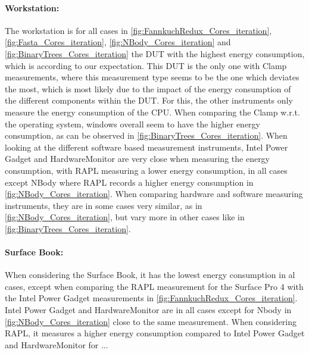 \paragraph{Workstation:} The workstation is for all cases in \cref*{fig:FannkuchRedux_Cores_iteration}, \cref*{fig:Fasta_Cores_iteration}, \cref*{fig:NBody_Cores_iteration} and \cref*{fig:BinaryTrees_Cores_iteration} the DUT with the highest energy consumption, which is according to our expectation. This DUT is the only one with Clamp measurements, where this measurement type seems to be the one which deviates the most, which is most likely due to the impact of the energy consumption of the different components within the DUT. For this, the other instruments only measure the energy consumption of the CPU. When comparing the Clamp w.r.t. the operating system, windows overall seem to have the higher energy consumption, as can be observed in \cref*{fig:BinaryTrees_Cores_iteration}. When looking at the different software based measurement instruments, Intel Power Gadget and HardwareMonitor are very close when measuring the energy consumption, with RAPL measuring a lower energy consumption, in all cases except NBody where RAPL records a higher energy consumption in \cref*{fig:NBody_Cores_iteration}. When comparing hardware and software measuring instruments, they are in some cases very similar, as in \cref*{fig:NBody_Cores_iteration}, but vary more in other cases like in \cref*{fig:BinaryTrees_Cores_iteration}.

\paragraph{Surface Book:} When considering the Surface Book, it has the lowest energy consumption in al cases, except when comparing the RAPL measurement for the Surface Pro 4 with the Intel Power Gadget measurements in \cref*{fig:FannkuchRedux_Cores_iteration}. Intel Power Gadget and HardwareMonitor are in all cases except for Nbody in \cref*{fig:NBody_Cores_iteration} close to the same measurement. When considering RAPL, it measures a higher energy consumption compared to Intel Power Gadget and HardwareMonitor for ...
% 
% 
